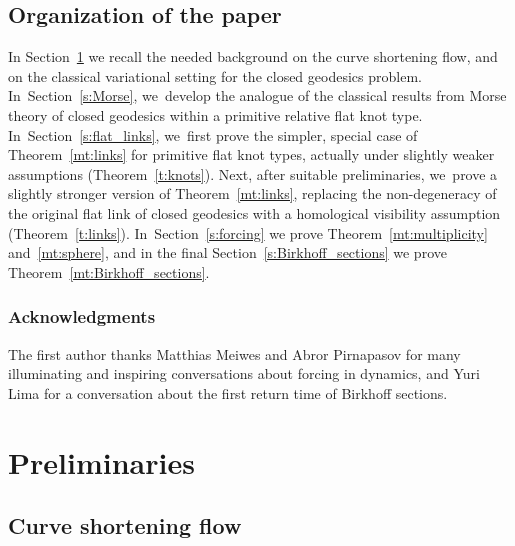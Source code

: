 \subsection{Organization of the paper}
In Section~\ref{s:preliminaries} we recall the needed background on the curve shortening flow, and on the classical variational setting for the closed geodesics problem. In~Section~\ref{s:Morse}, we~develop the analogue of the classical results from Morse theory of closed geodesics within a primitive relative flat knot type. In~Section~\ref{s:flat_links}, we~first prove the simpler, special case of Theorem~\ref{mt:links} for primitive flat knot types, actually under slightly weaker assumptions (Theorem~\ref{t:knots}). Next, after suitable preliminaries, we~prove a slightly stronger version of Theorem~\ref{mt:links}, replacing the non-degeneracy of the original flat link of closed geodesics with a homological visibility assumption (Theorem~\ref{t:links}). In~Section~\ref{s:forcing} we prove Theorem~\ref{mt:multiplicity} and~\ref{mt:sphere}, and in the final Section~\ref{s:Birkhoff_sections} we prove Theorem~\ref{mt:Birkhoff_sections}.

\subsubsection*{Acknowledgments}
The first author thanks Matthias Meiwes and Abror
Pirnapasov for many illuminating and inspiring conversations about forcing in dynamics, and Yuri Lima for a conversation about the first return time of Birkhoff sections.

\section{Preliminaries}\label{s:preliminaries}

\subsection{Curve shortening flow}
\label{ss:curve_shortening}

